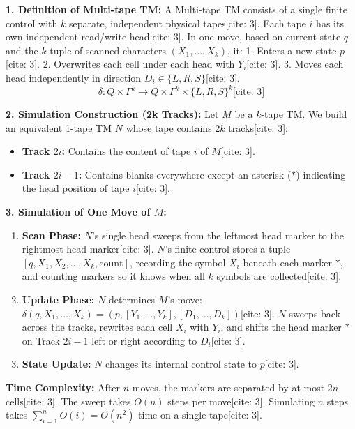 \documentclass[11pt,a4paper]{article}
\begin{document}
\begin{solutionbox}
\textbf{1. Definition of Multi-tape TM:}
A Multi-tape TM consists of a single finite control with $k$ separate, independent physical tapes[cite: 3]. Each tape $i$ has its own independent read/write head[cite: 3]. In one move, based on current state $q$ and the $k$-tuple of scanned characters $(X_1, \dots, X_k)$, it:
1. Enters a new state $p$[cite: 3].
2. Overwrites each cell under each head with $Y_i$[cite: 3].
3. Moves each head independently in direction $D_i \in \{L, R, S\}$[cite: 3].
$$\delta: Q \times \Gamma^k \rightarrow Q \times \Gamma^k \times \{L, R, S\}^k \text{[cite: 3]}$$

\textbf{2. Simulation Construction (2k Tracks):}
Let $M$ be a $k$-tape TM. We build an equivalent 1-tape TM $N$ whose tape contains $2k$ tracks[cite: 3]:
\begin{itemize}[leftmargin=*]
    \item \textbf{Track $2i$:} Contains the content of tape $i$ of $M$[cite: 3].
    \item \textbf{Track $2i-1$:} Contains blanks everywhere except an asterisk ($*$) indicating the head position of tape $i$[cite: 3].
\end{itemize}

\textbf{3. Simulation of One Move of $M$:}
\begin{enumerate}[leftmargin=*]
    \item \textbf{Scan Phase:} $N$'s single head sweeps from the leftmost head marker to the rightmost head marker[cite: 3]. $N$'s finite control stores a tuple $[q, X_1, X_2, \dots, X_k, \text{count}]$, recording the symbol $X_i$ beneath each marker $*$, and counting markers so it knows when all $k$ symbols are collected[cite: 3].
    \item \textbf{Update Phase:} $N$ determines $M$'s move: $\delta(q, X_1, \dots, X_k) = (p, [Y_1, \dots, Y_k], [D_1, \dots, D_k])$[cite: 3]. $N$ sweeps back across the tracks, rewrites each cell $X_i$ with $Y_i$, and shifts the head marker $*$ on Track $2i-1$ left or right according to $D_i$[cite: 3].
    \item \textbf{State Update:} $N$ changes its internal control state to $p$[cite: 3].
\end{enumerate}
\textbf{Time Complexity:} After $n$ moves, the markers are separated by at most $2n$ cells[cite: 3]. The sweep takes $O(n)$ steps per move[cite: 3]. Simulating $n$ steps takes $\sum_{i=1}^n O(i) = O(n^2)$ time on a single tape[cite: 3].
\end{solutionbox}
\end{document}
